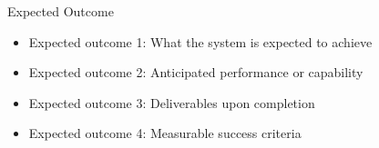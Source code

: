 
\begin{frame}{Expected Outcome}
    \begin{itemize}
        \item Expected outcome 1: What the system is expected to achieve
        \item Expected outcome 2: Anticipated performance or capability
        \item Expected outcome 3: Deliverables upon completion
        \item Expected outcome 4: Measurable success criteria
    \end{itemize}
\end{frame}
